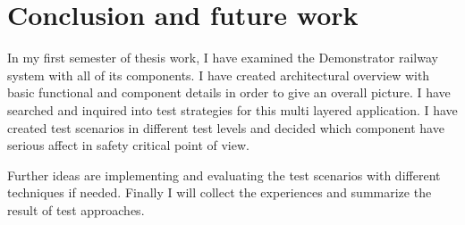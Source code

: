 \chapter{Conclusion and future work}
In my first semester of thesis work, I have examined the Demonstrator railway system with all of its components. I have created architectural overview with basic functional and component details in order to give an overall picture. I have searched and inquired into test strategies for this multi layered application. I have created test scenarios in different test levels and decided which component have serious affect in safety critical point of view.

Further ideas are implementing and evaluating the test scenarios with different techniques if needed. Finally I will collect the experiences and summarize the result of test approaches.